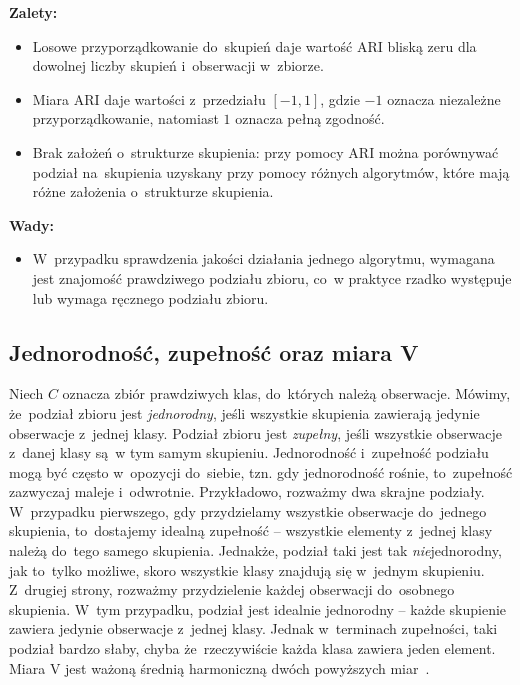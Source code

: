 \documentclass{praca1}
\begin{document}
\textbf{Zalety:}
\begin{itemize}
\item Losowe przyporządkowanie do~skupień daje wartość $\textrm{ARI}$ bliską zeru dla dowolnej liczby skupień i~obserwacji w~zbiorze.
\item Miara $\textrm{ARI}$ daje wartości z~przedziału $[-1, 1]$, gdzie $-1$ oznacza niezależne przyporządkowanie, natomiast $1$ oznacza pełną zgodność.
\item Brak założeń o~strukturze skupienia: przy pomocy $\textrm{ARI}$ można porównywać podział na~skupienia uzyskany przy pomocy różnych algorytmów, które mają różne założenia o~strukturze skupienia.
\end{itemize}

\textbf{Wady:}
\begin{itemize}
\item W~przypadku sprawdzenia jakości działania jednego algorytmu, wymagana jest znajomość prawdziwego podziału zbioru, co~w praktyce rzadko występuje lub wymaga ręcznego podziału zbioru.
\end{itemize}

\subsection{Jednorodność, zupełność oraz miara V}

Niech $C$ oznacza zbiór prawdziwych klas, do~których należą obserwacje. Mówimy, że~podział zbioru jest \emph{jednorodny}, jeśli wszystkie skupienia zawierają jedynie obserwacje z~jednej klasy. Podział zbioru jest \emph{zupełny}, jeśli wszystkie obserwacje z~danej klasy są~w tym samym skupieniu. Jednorodność i~zupełność podziału mogą być często w~opozycji do~siebie, tzn. gdy jednorodność rośnie, to~zupełność zazwyczaj maleje i~odwrotnie. Przykładowo, rozważmy dwa skrajne podziały. W~przypadku pierwszego, gdy przydzielamy wszystkie obserwacje do~jednego skupienia, to~dostajemy idealną zupełność -- wszystkie elementy z~jednej klasy należą do~tego samego skupienia. Jednakże, podział taki jest tak \emph{nie}jednorodny, jak to~tylko możliwe, skoro wszystkie klasy znajdują się w~jednym skupieniu. Z~drugiej strony, rozważmy przydzielenie każdej obserwacji do~osobnego skupienia. W~tym przypadku, podział jest idealnie jednorodny -- każde skupienie zawiera jedynie obserwacje z~jednej klasy. Jednak w~terminach zupełności, taki podział bardzo słaby, chyba że~rzeczywiście każda klasa zawiera jeden element. Miara $\textrm{V}$ jest ważoną średnią harmoniczną dwóch powyższych miar~\cite{Rosenberg2007:vmeasure}.
\end{document}
